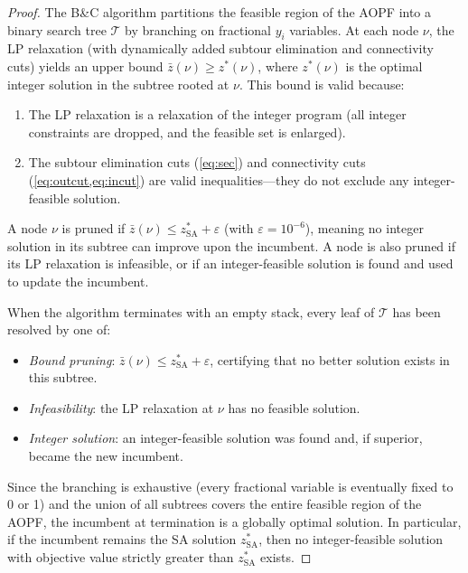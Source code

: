 \documentclass[11pt,a4paper]{article}
\begin{document}
\begin{proof}
The B\&C algorithm partitions the feasible region of the AOPF into a binary search tree $\mathcal{T}$ by branching on fractional $y_i$ variables.
At each node $\nu$, the LP relaxation (with dynamically added subtour elimination and connectivity cuts) yields an upper bound $\bar{z}(\nu) \geq z^*(\nu)$, where $z^*(\nu)$ is the optimal integer solution in the subtree rooted at $\nu$.
This bound is valid because:
\begin{enumerate}[nosep]
  \item The LP relaxation is a relaxation of the integer program (all integer constraints are dropped, and the feasible set is enlarged).
  \item The subtour elimination cuts (\cref{eq:sec}) and connectivity cuts (\cref{eq:outcut,eq:incut}) are valid inequalities---they do not exclude any integer-feasible solution.
\end{enumerate}

A node $\nu$ is pruned if $\bar{z}(\nu) \leq z^*_{\text{SA}} + \varepsilon$ (with $\varepsilon = 10^{-6}$), meaning no integer solution in its subtree can improve upon the incumbent.
A node is also pruned if its LP relaxation is infeasible, or if an integer-feasible solution is found and used to update the incumbent.

When the algorithm terminates with an empty stack, every leaf of $\mathcal{T}$ has been resolved by one of:
\begin{itemize}[nosep]
  \item \emph{Bound pruning}: $\bar{z}(\nu) \leq z^*_{\text{SA}} + \varepsilon$, certifying that no better solution exists in this subtree.
  \item \emph{Infeasibility}: the LP relaxation at $\nu$ has no feasible solution.
  \item \emph{Integer solution}: an integer-feasible solution was found and, if superior, became the new incumbent.
\end{itemize}

Since the branching is exhaustive (every fractional variable is eventually fixed to 0 or 1) and the union of all subtrees covers the entire feasible region of the AOPF, the incumbent at termination is a globally optimal solution.
In particular, if the incumbent remains the SA solution $z^*_{\text{SA}}$, then no integer-feasible solution with objective value strictly greater than $z^*_{\text{SA}}$ exists.
\end{proof}
\end{document}
